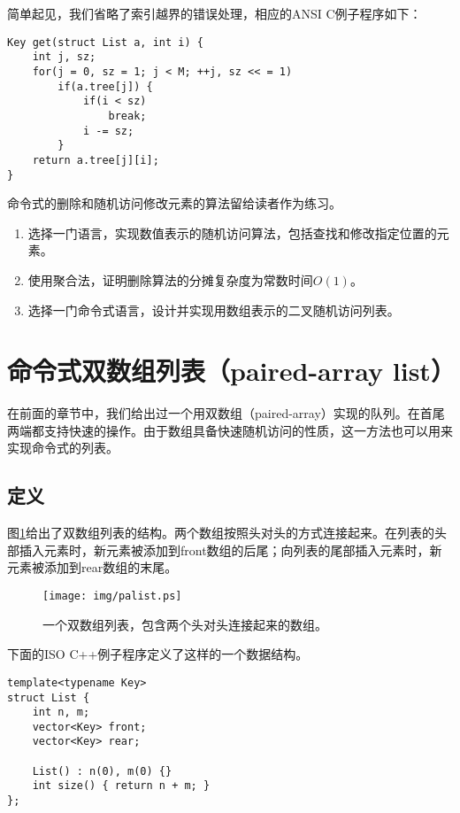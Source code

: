 \documentclass[UTF8]{article}
\begin{document}
简单起见，我们省略了索引越界的错误处理，相应的ANSI C例子程序如下：

\begin{lstlisting}
Key get(struct List a, int i) {
    int j, sz;
    for(j = 0, sz = 1; j < M; ++j, sz << = 1)
        if(a.tree[j]) {
            if(i < sz)
                break;
            i -= sz;
        }
    return a.tree[j][i];
}
\end{lstlisting}

命令式的删除和随机访问修改元素的算法留给读者作为练习。

\begin{Exercise}
\begin{enumerate}
\item 选择一门语言，实现数值表示的随机访问算法，包括查找和修改指定位置的元素。

\item 使用聚合法，证明删除算法的分摊复杂度为常数时间$O(1)$。

\item 选择一门命令式语言，设计并实现用数组表示的二叉随机访问列表。
\end{enumerate}
\end{Exercise}

\section{命令式双数组列表（paired-array list）}

在前面的章节中，我们给出过一个用双数组（paired-array）实现的队列。在首尾两端都支持快速的操作。由于数组具备快速随机访问的性质，这一方法也可以用来实现命令式的列表。

\subsection{定义}

图\ref{fig:palist}给出了双数组列表的结构。两个数组按照头对头的方式连接起来。在列表的头部插入元素时，新元素被添加到front数组的后尾；向列表的尾部插入元素时，新元素被添加到rear数组的末尾。

\begin{figure}[htbp]
  \centering
  \texttt{[image: img/palist.ps]}
  \caption{一个双数组列表，包含两个头对头连接起来的数组。} \label{fig:palist}
\end{figure}

下面的ISO C++例子程序定义了这样的一个数据结构。

\lstset{language=C++}
\begin{lstlisting}
template<typename Key>
struct List {
    int n, m;
    vector<Key> front;
    vector<Key> rear;

    List() : n(0), m(0) {}
    int size() { return n + m; }
};
\end{lstlisting}
\end{document}
